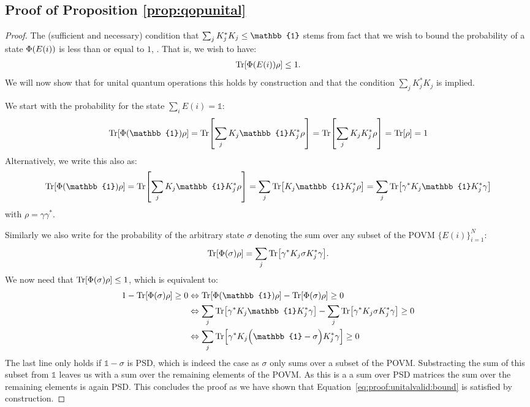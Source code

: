 \subsection{Proof of Proposition \ref{prop:qopunital}}
\label{sec:proof:prop:qopunital}

\propqopunital*

\begin{proof}
	The (sufficient and necessary) condition that $\sum_j \kraus_j^* \kraus_j \leq \mathbb{1}$ stems from fact that we wish to bound the probability of a state $\Phi (E(i))$ is less than or equal to $1$, \cf \citep[Proof of Theorem 8.1]{nielsen2001quantum}. That is, we wish to have:
	\begin{align}
		\Tr [ \Phi (E(i)) \rho] \leq 1. \label{eq:proof:unitalvalid:bound}
	\end{align}
	We will now show that for unital quantum operations this holds by construction and that the condition $\sum_j K_j^* K_j$ is implied.

	We start with the probability for the state $\sum_i E(i)=\mathbb{1}$:
	\begin{align}
		\Tr [ \qop (\mathbb{1}) \rho]
		=
		\Tr [ \sum_j \kraus_j  \mathbb{1} \kraus_j^* \rho ]
		=
		\Tr [ \sum_j \kraus_j  \kraus_j^* \rho ]
		=
		\Tr [  \rho ] =1
	\end{align}
	Alternatively, we write this also as:
	\begin{align}
		\Tr [ \qop (\mathbb{1}) \rho]
		=
		\Tr [ \sum_j \kraus_j  \mathbb{1} \kraus_j^* \rho ]
		=
		\sum_j \Tr [ \kraus_j  \mathbb{1} \kraus_j^* \rho ]
		=
		\sum_j \Tr [\gamma^* \kraus_j  \mathbb{1} \kraus_j^* \gamma ]
	\end{align}
	with $\rho=\gamma \gamma^*$.

	Similarly we also write for the probability of the arbitrary state $\sigma$ denoting the sum over any subset of the POVM $\{ E(i) \}_{i=1}^{N}$:
	\begin{align}
		\Tr [ \Phi (\sigma) \rho]
		=
		\sum_j \Tr [\gamma^* K_j \sigma K_j^* \gamma ].
	\end{align}
	We now need that $\Tr [ \Phi (\sigma) \rho]\leq1$, which is equivalent to:
	\begin{align}
		1 - \Tr [ \qop (\sigma) \rho] \geq 0
		 & \Leftrightarrow
		\Tr [ \qop (\mathbb{1}) \rho] - \Tr [ \qop (\sigma) \rho] \geq 0
		\\
		 & \Leftrightarrow
		\sum_j \Tr [\gamma^* \kraus_j  \mathbb{1} \kraus_j^* \gamma ]
		-
		\sum_j \Tr [\gamma^* \kraus_j \sigma \kraus_j^* \gamma ] \geq 0
		\\
		 & \Leftrightarrow
		\sum_j \Tr \Bigl[\gamma^* \kraus_j  \Bigl( \mathbb{1} -\sigma \Bigr)  \kraus_j^* \gamma \Bigr] \geq 0
	\end{align}
	The last line only holds if $\mathbb{1}- \sigma$ is PSD, which is indeed the case as $\sigma$ only sums over a subset of the POVM. Substracting the sum of this subset from $\mathbb{1}$ leaves us with a sum over the remaining elements of the POVM. As this is a a sum over PSD matrices the sum over the remaining elements is again PSD.
	This concludes the proof as we have shown that Equation~\ref{eq:proof:unitalvalid:bound} is satisfied by construction.
\end{proof}

